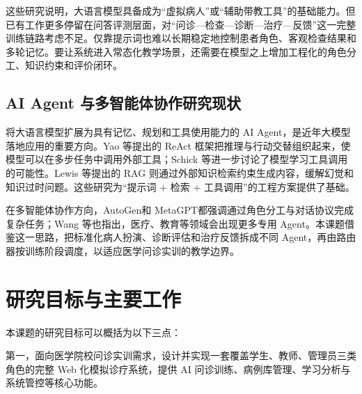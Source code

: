 这些研究说明，大语言模型具备成为“虚拟病人”或“辅助带教工具”的基础能力。但已有工作更多停留在问答评测层面，对“问诊—检查—诊断—治疗—反馈”这一完整训练链路考虑不足。仅靠提示词也难以长期稳定地控制患者角色、客观检查结果和多轮记忆。要让系统进入常态化教学场景，还需要在模型之上增加工程化的角色分工、知识约束和评价闭环。

\subsection{AI Agent 与多智能体协作研究现状}

将大语言模型扩展为具有记忆、规划和工具使用能力的 AI Agent，是近年大模型落地应用的重要方向。Yao 等\cite{yao2023react}提出的 ReAct 框架把推理与行动交替组织起来，使模型可以在多步任务中调用外部工具；Schick 等\cite{schick2023toolformer}进一步讨论了模型学习工具调用的可能性。Lewis 等\cite{lewis2020rag}提出的 RAG 则通过外部知识检索约束生成内容，缓解幻觉和知识过时问题。这些研究为“提示词 + 检索 + 工具调用”的工程方案提供了基础。

在多智能体协作方向，AutoGen\cite{wu2023autogen}和 MetaGPT\cite{hong2024metagpt}都强调通过角色分工与对话协议完成复杂任务；Wang 等\cite{wang2024llmagent}也指出，医疗、教育等领域会出现更多专用 Agent。本课题借鉴这一思路，把标准化病人扮演、诊断评估和治疗反馈拆成不同 Agent，再由路由器按训练阶段调度，以适应医学问诊实训的教学边界。

\section{研究目标与主要工作}

本课题的研究目标可以概括为以下三点：

第一，面向医学院校问诊实训需求，设计并实现一套覆盖学生、教师、管理员三类角色的完整 Web 化模拟诊疗系统，提供 AI 问诊训练、病例库管理、学习分析与系统管控等核心功能。

